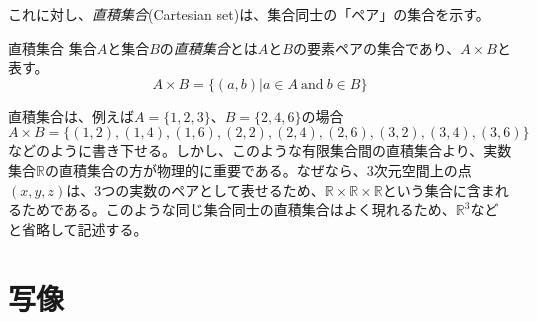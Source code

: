 これに対し、\emph{直積集合}(Cartesian set)は、集合同士の「ペア」の集合を示す。
\begin{definition*}{直積集合}
	集合\(A\)と集合\(B\)の\emph{直積集合}とは\(A\)と\(B\)の要素ペアの集合であり、\(A\times B\)と表す。
	\begin{equation}
		A \times B=\{(a,b)| a \in A \ \mathrm{and} \ b \in B\}
	\end{equation}
\end{definition*}
直積集合は、例えば\(A=\{1,2,3\}\)、\(B=\{2,4,6\}\)の場合
\begin{equation}
	A \times B=\{(1,2),(1,4),(1,6),(2,2),(2,4),(2,6),(3,2),(3,4),(3,6)\}
\end{equation}
などのように書き下せる。しかし、このような有限集合間の直積集合より、実数集合\(\mathbb{R}\)の直積集合の方が物理的に重要である。なぜなら、3次元空間上の点\((x,y,z)\)は、3つの実数のペアとして表せるため、\(\mathbb{R}\times \mathbb{R}\times \mathbb{R}\)という集合に含まれるためである。このような同じ集合同士の直積集合はよく現れるため、\(\mathbb{R}^3\)などと省略して記述する。
\section{写像}
